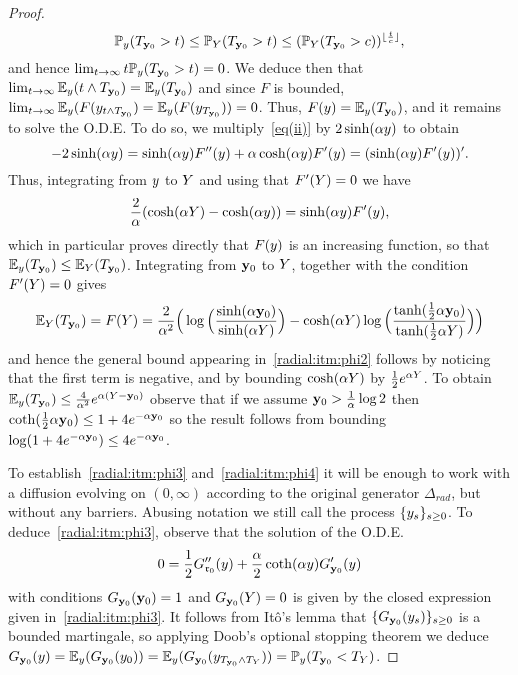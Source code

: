\begin{proof}
\[\mathbb{P}_y(T_{{\bf y}_0}>t)\leq \mathbb{P}_Y(T_{{\bf y}_0}>t)\leq(\mathbb{P}_{Y}(T_{{\bf y}_0}>c))^{\lfloor\frac{t}{c}\rfloor},\]
and hence $\lim_{t\to\infty}t\mathbb{P}_y(T_{{\bf y}_0}>t)=0$. We deduce then that $\lim_{t\to\infty}\mathbb{E}_y(t\wedge T_{{\bf y}_0})=\mathbb{E}_y(T_{{\bf y}_0})$ and since $F$ is bounded, $\lim_{t\to\infty}\mathbb{E}_{y}(F(y_{t\wedge T_{{\bf y}_0}})= \mathbb{E}_{y}(F(y_{T_{{\bf y}_0}}))=0$. Thus, $F(y)=\mathbb{E}_y(T_{{\bf y}_0})$, and it remains to solve the O.D.E. To do so, we  multiply~\eqref{eq(ii)} by $2\sinh(\alpha y)$ to obtain
\[-2\sinh(\alpha y) = \sinh(\alpha y)F''(y)+\alpha\cosh(\alpha y)F'(y) = (\sinh(\alpha y)F'(y))'.\]
Thus, integrating from $y$ to $Y$ and using that $F'(Y)=0$ we have
\[\frac{2}{\alpha}(\cosh(\alpha Y)-\cosh(\alpha y)) = \sinh(\alpha y)F'(y),\]
which in particular proves directly that $F(y)$ is an increasing function, so that $\mathbb{E}_{y}(T_{{\bf y}_0})\leq \mathbb{E}_Y(T_{{\bf y}_0})$. Integrating from ${\bf y}_0$ to $Y$, together with the condition $F'(Y)=0$ gives
\[
\mathbb{E}_Y(T_{{\bf y}_0}) = F(Y) = \frac{2}{\alpha^2}\Big(\log\Big(\frac{\sinh(\alpha {\bf y}_0)}{\sinh(\alpha Y)}\Big)-\cosh(\alpha Y)\log\Big(\frac{\tanh(\tfrac12\alpha{\bf y}_0)}{\tanh(\tfrac12\alpha Y)}\Big)\Big)
\]
and hence the general bound appearing in~\eqref{radial:itm:phi2} follows by noticing that the first term is negative, and by bounding $\cosh(\alpha Y)$ by $\frac{1}{2}e^{\alpha Y}$. To obtain $\mathbb{E}_{y}(T_{{\bf y}_0})\leq \frac{4}{\alpha^2} e^{\alpha(Y-{\bf y}_0)}$ observe that if we assume ${\bf y}_0>\tfrac{1}{\alpha}\log 2$ then $\operatorname{coth}(\tfrac12\alpha{\bf y}_0)\leq 1+4e^{-\alpha{\bf y}_0}$ so the result follows from bounding $\log(1+4e^{-\alpha{\bf y}_0})\leq4e^{-\alpha{\bf y}_0}$. 

To establish~\eqref{radial:itm:phi3} and~\eqref{radial:itm:phi4} it will be enough to work with a diffusion evolving on $(0,\infty)$ according to the original generator $\Delta_{rad}$, but without any barriers. Abusing notation we still call the process $\{y_s\}_{s \ge 0}$. To deduce~\eqref{radial:itm:phi3}, observe that the solution of the O.D.E.
\[
0 = \frac{1}{2}G_{\mathfrak{r}_0}''(y) + \frac{\alpha}{2}\operatorname{coth}(\alpha y)G_{{\bf y}_0}'(y)
\]
with conditions $G_{{\bf y}_0}({\bf y}_0)=1$ and $G_{{\bf y}_0}(Y)=0$ is given by the closed expression given in~\eqref{radial:itm:phi3}. It follows from Itô's lemma that $\{G_{{\bf y}_0}(y_s)\}_{s \ge 0}$ is a bounded martingale, so applying Doob's optional stopping theorem we deduce $G_{{\bf y}_0}(y)=\mathbb{E}_y(G_{{\bf y}_0}(y_0))=\mathbb{E}_y(G_{{\bf y}_0}(y_{T_{{\bf y}_0}\wedge T_Y}))=\mathbb{P}_{y}(T_{{\bf y}_0}<T_Y)$.


\end{proof}
